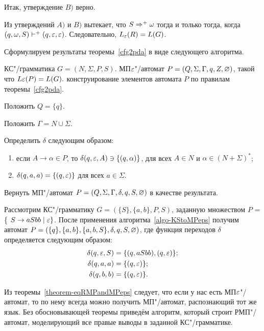 \begin{myproof}
Итак, утверждение $B)$ верно.

Из утверждений $A)$ и $B)$ вытекает, что $S\Rightarrow^+\omega$ тогда и только тогда, когда $(q,\omega,S)\vdash^+(q,\varepsilon,\varepsilon)$. Следовательно, $L_\varepsilon(R)=L(G)$.
\end{myproof}

Сформулируем результаты теоремы~\ref{cfg2pda} в виде следующего алгоритма.

{\label{algo-KStoMPeps} КС"/грамматика $G = (N, \Sigma, P, S)$. }
{МП$\varepsilon$"/автомат $P = (Q, \Sigma, \Gamma, q, Z, \varnothing)$, такой что $L\varepsilon(P) = L(G).$}
{ конструирование элементов автомата $P$ по правилам теоремы~\ref{cfg2pda}.}
{
\item Положить $Q = \{ q \}$.

\item Положить $\Gamma = N \cup \Sigma$.

\item Определить $\delta$ следующим образом:
	\begin{enumerate}
		\item если $A \to \alpha \in P$, то $\delta(q, \varepsilon, A) \ni \{ (q, \alpha) \}$, для всех $A \in N$ и $\alpha \in (N + \Sigma)^*$;
		\item $\delta(q, a, a) = \{ (q, \varepsilon) \}$ для всех $a \in \Sigma$.
  \end{enumerate}  

\item Вернуть МП"/автомат $P = (Q, \Sigma, \Gamma, \delta, q, S, \varnothing)$ в качестве результата.
}

\begin{myexample}
Рассмотрим КС"/грамматику $G = (\{S\}, \{a, b\}, P, S)$, заданную множеством $P$ = \{
$S \to aSbb \mid \varepsilon \}$.
После применения алгоритма~\ref{algo-KStoMPeps} получим автомат $P = (\{q\},  \{a, b\}, \{a, b, S\}, \delta, q, S, \varnothing)$, где функция переходов $\delta$ определяется следующим образом:
\begin{align*}
    \delta(q, \varepsilon, S) 	&= \{ (q, aSbb), (q, \varepsilon) \}; \\
    \delta(q, a, a) 		&= \{ (q, \varepsilon) \}; \\
    \delta(q, b, b) 		&= \{ (q, \varepsilon) \}. \\
\end{align*}
\end{myexample}

Из теоремы~\ref{theorem-eqRMPandMPeps} следует, что если у нас есть МП$\varepsilon$"/автомат, то по нему всегда можно получить МП"/автомат, распознающий тот же язык. Без обосновывающей теоремы приведём алгоритм, который строит РМП"/автомат, моделирующий все правые выводы в заданной КС"/грамматике.

